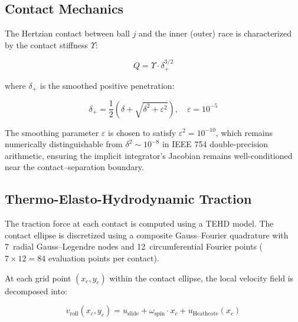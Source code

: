 \documentclass[machines,article,submit,pdftex,moreauthors]{Definitions/mdpi}
\begin{document}
\subsection{Contact Mechanics}
\label{sec:contact}

The Hertzian contact between ball $j$ and the inner (outer) race is characterized by the contact stiffness $\Upsilon$:

\begin{linenomath}
\begin{equation}
    Q = \Upsilon \cdot \delta_+^{3/2}
    \label{eq:hertz_q}
\end{equation}
\end{linenomath}

where $\delta_+$ is the smoothed positive penetration:

\begin{linenomath}
\begin{equation}
    \delta_+ = \frac{1}{2}\left(\delta + \sqrt{\delta^2 + \varepsilon^2}\right), \quad \varepsilon = 10^{-5}
    \label{eq:smooth_delta}
\end{equation}
\end{linenomath}

The smoothing parameter $\varepsilon$ is chosen to satisfy $\varepsilon^2 = 10^{-10}$, which remains numerically distinguishable from $\delta^2 \sim 10^{-8}$ in IEEE 754 double-precision arithmetic, ensuring the implicit integrator's Jacobian remains well-conditioned near the contact--separation boundary.


\subsection{Thermo-Elasto-Hydrodynamic Traction}
\label{sec:tehd}

The traction force at each contact is computed using a TEHD model. The contact ellipse is discretized using a composite Gauss--Fourier quadrature with 7~radial Gauss--Legendre nodes and 12~circumferential Fourier points ($7 \times 12 = 84$ evaluation points per contact).

At each grid point $(x_c, y_c)$ within the contact ellipse, the local velocity field is decomposed into:

\begin{linenomath}
\begin{equation}
    v_{\text{roll}}(x_c, y_c) = u_{\text{slide}} + \omega_{\text{spin}} \cdot x_c + u_{\text{Heathcote}}(x_c)
\end{equation}
\end{linenomath}
\end{document}
